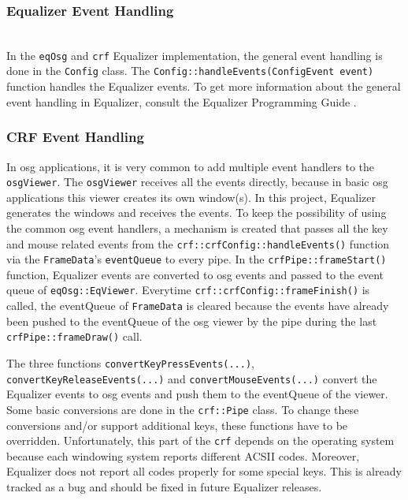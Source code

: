 \subsubsection{Equalizer Event Handling}
\label{sec:EqualizerEventhandling}\hfill\\
In the \texttt{eqOsg} and \texttt{crf} Equalizer implementation, the general event handling is done in the \texttt{Config} class. The \texttt{Config::handleEvents(ConfigEvent event)} function handles the Equalizer events. To get more information about the general event handling in Equalizer, consult the Equalizer Programming Guide \cite{eqPG}.

\subsubsection{CRF Event Handling}
\label{sec:crfEventHandling}
In \gls{osg} applications, it is very common to add multiple event handlers to the \texttt{osgViewer}. The \texttt{osgViewer} receives all the events directly, because in basic \gls{osg} applications this viewer creates its own window(s). In this project, Equalizer generates the windows and receives the events. To keep the possibility of using the common \gls{osg} event handlers, a mechanism is created that passes all the key and mouse related events from the \texttt{crf::crfConfig::handleEvents()} function via the \texttt{FrameData}'s \texttt{eventQueue} to every pipe. In the \texttt{crfPipe::frameStart()} function, Equalizer events are converted to \gls{osg} events and passed to the event queue of \texttt{eqOsg::EqViewer}. Everytime \texttt{crf::crfConfig::frameFinish()} is called, the eventQueue of \texttt{FrameData} is cleared because the events have already been pushed to the eventQueue of the \gls{osg} viewer by the pipe during the last \texttt{crfPipe::frameDraw()} call.

The three functions \texttt{convertKeyPressEvents(...)}, \texttt{convertKeyReleaseEvents(...)} and \texttt{convertMouseEvents(...)} convert the Equalizer events to \gls{osg} events and push them to the eventQueue of the viewer. Some basic conversions are done in the \texttt{crf::Pipe} class. To change these conversions and/or support additional keys, these functions have to be overridden. Unfortunately, this part of the \texttt{crf} depends on the operating system because each windowing system reports different ACSII codes. Moreover, Equalizer does not report all codes properly for some special keys. This is already tracked as a bug and should be fixed in future Equalizer releases.

